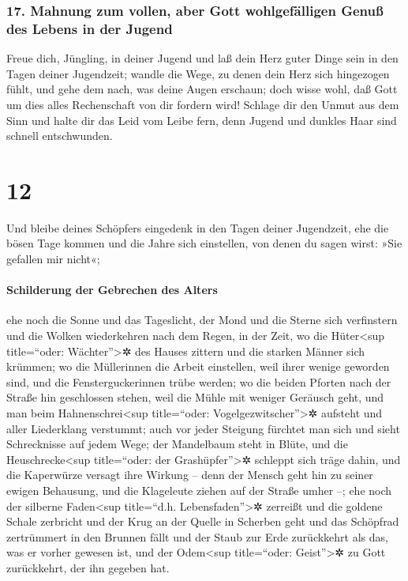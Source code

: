 \hypertarget{mahnung-zum-vollen-aber-gott-wohlgefuxe4lligen-genuuxdf-des-lebens-in-der-jugend}{%
\subsubsection{17. Mahnung zum vollen, aber Gott wohlgefälligen Genuß
des Lebens in der
Jugend}\label{mahnung-zum-vollen-aber-gott-wohlgefuxe4lligen-genuuxdf-des-lebens-in-der-jugend}}

Freue dich, Jüngling, in deiner Jugend und laß dein Herz
guter Dinge sein in den Tagen deiner Jugendzeit; wandle die Wege, zu
denen dein Herz sich hingezogen fühlt, und gehe dem nach, was deine
Augen erschaun; doch wisse wohl, daß Gott um dies alles Rechenschaft von
dir fordern wird! Schlage dir den Unmut aus dem Sinn und
halte dir das Leid vom Leibe fern, denn Jugend und dunkles Haar sind
schnell entschwunden.

\hypertarget{section-11}{%
\section{12}\label{section-11}}

Und bleibe deines Schöpfers eingedenk in den Tagen deiner
Jugendzeit, ehe die bösen Tage kommen und die Jahre sich einstellen, von
denen du sagen wirst: »Sie gefallen mir nicht«;

\hypertarget{schilderung-der-gebrechen-des-alters}{%
\paragraph{Schilderung der Gebrechen des
Alters}\label{schilderung-der-gebrechen-des-alters}}

ehe noch die Sonne und das Tageslicht, der Mond und die
Sterne sich verfinstern und die Wolken wiederkehren nach dem Regen,
in der Zeit, wo die Hüter\textless sup title=``oder:
Wächter''\textgreater✲ des Hauses zittern und die starken Männer sich
krümmen; wo die Müllerinnen die Arbeit einstellen, weil ihrer wenige
geworden sind, und die Fensterguckerinnen trübe werden; wo
die beiden Pforten nach der Straße hin geschlossen stehen, weil die
Mühle mit weniger Geräusch geht, und man beim Hahnenschrei\textless sup
title=``oder: Vogelgezwitscher''\textgreater✲ aufsteht und aller
Liederklang verstummt; auch vor jeder Steigung fürchtet
man sich und sieht Schrecknisse auf jedem Wege; der Mandelbaum steht in
Blüte, und die Heuschrecke\textless sup title=``oder: der
Grashüpfer''\textgreater✲ schleppt sich träge dahin, und die Kaperwürze
versagt ihre Wirkung -- denn der Mensch geht hin zu seiner ewigen
Behausung, und die Klageleute ziehen auf der Straße umher --;
ehe noch der silberne Faden\textless sup title=``d.h.
Lebensfaden''\textgreater✲ zerreißt und die goldene Schale zerbricht und
der Krug an der Quelle in Scherben geht und das Schöpfrad zertrümmert in
den Brunnen fällt und der Staub zur Erde zurückkehrt als
das, was er vorher gewesen ist, und der Odem\textless sup title=``oder:
Geist''\textgreater✲ zu Gott zurückkehrt, der ihn gegeben hat.


